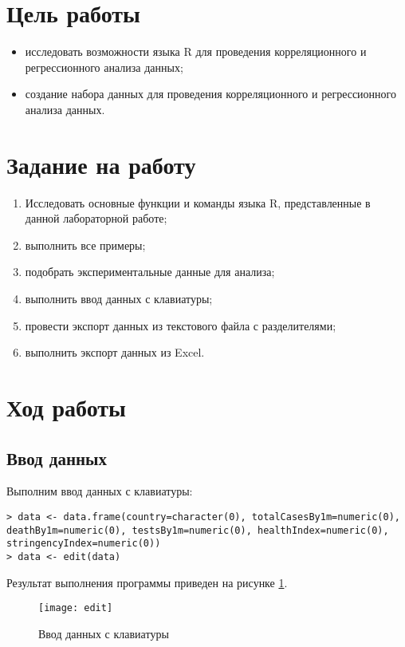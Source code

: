 \documentclass[a4paper,14pt]{extarticle}
\begin{document}


\section{Цель работы}
\begin{itemize}
    \item исследовать возможности языка R для проведения корреляционного и регрессионного анализа данных;
    \item создание набора данных для проведения корреляционного и регрессионного анализа данных.
\end{itemize}

\section{Задание на работу}
\begin{enumerate}
    \item Исследовать основные функции и команды языка R, представленные в
          данной лабораторной работе;
    \item выполнить все примеры;
    \item подобрать экспериментальные данные для анализа;
    \item выполнить ввод данных с клавиатуры;
    \item провести экспорт данных из текстового файла с разделителями;
    \item выполнить экспорт данных из Excel.
\end{enumerate}

\section{Ход работы}
\subsection{Ввод данных}
Выполним ввод данных с клавиатуры:
\begin{lstlisting}
> data <- data.frame(country=character(0), totalCasesBy1m=numeric(0), deathBy1m=numeric(0), testsBy1m=numeric(0), healthIndex=numeric(0), stringencyIndex=numeric(0))
> data <- edit(data)
\end{lstlisting}
Результат выполнения программы приведен на рисунке \ref{fig:edit}.
\begin{figure}[H]
    \centering
    \texttt{[image: edit]}
    \caption{Ввод данных с клавиатуры}
    \label{fig:edit}
\end{figure}
\end{document}
